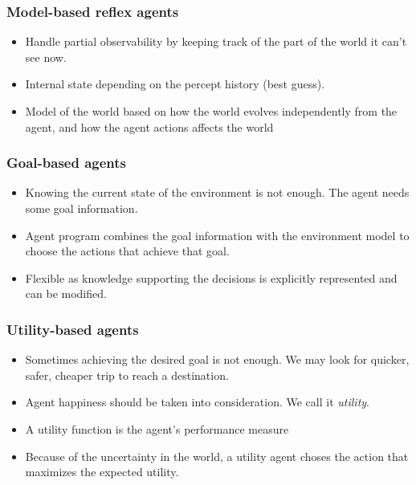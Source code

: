 \subsubsection{Model-based reflex agents}

\begin{itemize}
  \item Handle partial observability by keeping track of the part of the
    world it can’t see now.
  \item Internal state depending on the percept history (best guess).
  \item Model of the world based on how the world evolves 
    independently from the agent, and how the agent actions
    affects the world
\end{itemize}

\subsubsection{Goal-based agents}

\begin{itemize}
  \item Knowing the current state of the environment is not enough.
    The agent needs some goal information.
  \item Agent program combines the goal information with the
    environment model to choose the actions that achieve that
    goal.
  \item Flexible as knowledge supporting the decisions is
    explicitly represented and can be modified.
\end{itemize}

\subsubsection{Utility-based agents}

\begin{itemize}
  \item Sometimes achieving the desired goal is not enough. We
    may look for quicker, safer, cheaper trip to reach a
    destination.
  \item Agent happiness should be taken into consideration. We
    call it \textit{utility}.
  \item A utility function is the agent’s performance measure
  \item Because of the uncertainty in the world, a utility agent
    choses the action that maximizes the expected utility.
\end{itemize}

